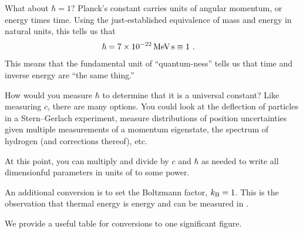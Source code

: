 \documentclass[12pt, oneside]{report}    %
\begin{document}
What about $\hbar = 1$? Planck's constant carries units of angular momentum, or energy times time. Using the just-established equivalence of mass and energy in natural units, this tells us that
\begin{align}
    \hbar &= 7 \times 10^{-22}\,\textnormal{MeV}\,\textnormal{s}  \equiv 1 \ . 
\end{align}
This means that the fundamental unit of ``quantum-ness'' tells us that time and inverse energy are ``the same thing.''
\begin{example}
How would you measure $\hbar$ to determine that it is a universal constant? Like measuring $c$, there are many options. You could look at the deflection of particles in a Stern--Gerlach experiment, measure distributions of position uncertainties given multiple measurements of a momentum eigenstate, the spectrum of hydrogen (and corrections thereof), etc. 
\end{example}
At this point, you can multiply and divide by $c$ and $\hbar$ as needed to write all dimensionful parameters in units of \GeV{} to some power. 
\begin{example}
An additional conversion is to set the Boltzmann factor, $k_\textnormal{B} =1$. This is the observation that thermal energy is energy and can be measured in \GeV{}.
\end{example}
We provide a useful table for conversions to one significant figure.
\end{document}
